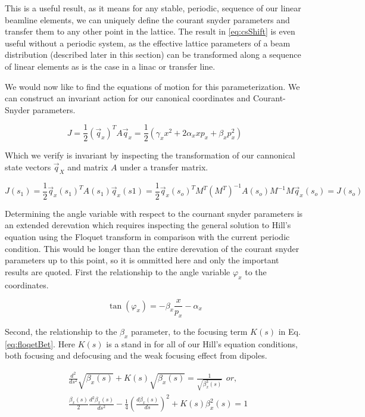 This is a useful result, as it means for any stable, periodic, sequence of our linear beamline elements, we can uniquely define the courant snyder parameters and transfer them to any other point in the lattice. The result in \ref{eq:csShift} is even useful without a periodic system, as the effective lattice parameters of a beam distribution (described later in this section) can be transformed along a sequence of linear elements as is the case in a linac or transfer line.

We would now like to find the equations of motion for this parameterization. We can construct an invariant action for our canonical coordinates and Courant-Snyder parameters.

\begin{equation} \label{eq:csJ}
	J = \frac{1}{2} (\vec{q}_x)^T A \vec{q}_x = \frac{1}{2} (\gamma_x x^2 + 2\alpha_x x p_x + \beta_x p_x^2)
\end{equation}

Which we verify is invariant by inspecting the transformation of our cannonical state vectors $\vec{q}_X$ and matrix $A$ under a transfer matrix.

\begin{equation} \label{eq:Jinvariant}
	J(s_1) = \frac{1}{2} \vec{q}_x(s_1)^T A(s_1) \vec{q}_x(s1) = \frac{1}{2} \vec{q}_x(s_o)^T M^T (M^T)^{-1} A(s_o) M^{-1}  M \vec{q}_x(s_o) = J(s_o)
\end{equation}

Determining the angle variable with respect to the cournant snyder parameters is an extended derevation which requires inspecting the general solution to Hill's equation using the Floquet transform in comparison with the current periodic condition. This would be longer than the entire derevation of the courant snyder parameters up to this point, so it is ommitted here and only the important results are quoted. First the relationship to the angle variable $\varphi_x$ to the coordinates.

\begin{equation} \label{eq:csAngle}
	\tan{(\varphi_x)} = -\beta_x \frac{x}{p_x} - \alpha_x 
\end{equation}

Second, the relationship to the $\beta_x$ parameter, to the focusing term $K(s)$ in Eq. \ref{eq:floqetBet}. Here $K(s)$ is a stand in for all of our Hill's equation conditions, both focusing and defocusing and the weak focusing effect from dipoles. 

\begin{equation} \label{eq:floqetBet}
	\begin{split}
	&\frac{d^2}{ds^2}\sqrt{\beta_x(s)} + K(s)\sqrt{\beta_x(s)} = \frac{1}{\sqrt{\beta_x^3(s)}} \hspace{5pt} or,\\ 
	&\frac{\beta_x(s)}{2}\frac{d^2\beta_x(s)}{ds^2} - \frac{1}{4}\left(\frac{d\beta_x(s)}{ds}\right)^2 + K(s)\beta_x^2(s) = 1
	\end{split}
\end{equation}


